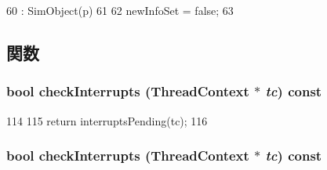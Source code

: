 \begin{DoxyCode}
60                            : SimObject(p)
61     {
62         newInfoSet = false;
63     }
\end{DoxyCode}


\subsection{関数}
\hypertarget{classMipsISA_1_1Interrupts_af3c66fb49fec598cf78aaec29d764952}{
\subsubsection[{checkInterrupts}]{\setlength{\rightskip}{0pt plus 5cm}bool checkInterrupts ({\bf ThreadContext} $\ast$ {\em tc}) const}}
\label{classMipsISA_1_1Interrupts_af3c66fb49fec598cf78aaec29d764952}



\begin{DoxyCode}
114     {
115         return interruptsPending(tc);
116     }
\end{DoxyCode}
\hypertarget{classMipsISA_1_1Interrupts_af3c66fb49fec598cf78aaec29d764952}{
\subsubsection[{checkInterrupts}]{\setlength{\rightskip}{0pt plus 5cm}bool checkInterrupts ({\bf ThreadContext} $\ast$ {\em tc}) const}}
\label{classMipsISA_1_1Interrupts_af3c66fb49fec598cf78aaec29d764952}



